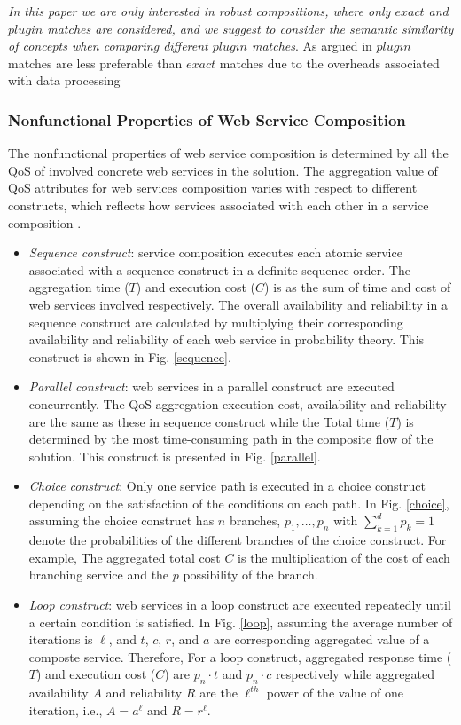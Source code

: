 \emph{In this paper we are only interested in robust compositions, where only $exact$ and $plugin$ matches are considered, and we suggest to consider the semantic similarity of concepts when comparing different $plugin$ matches}. As argued in \cite{lecue2009optimizing} $plugin$ matches are less preferable than $exact$ matches due to the overheads associated with data processing


\subsubsection{Nonfunctional Properties of Web Service Composition}
The nonfunctional properties of web service composition is determined by all the QoS of involved concrete web services in the solution. The aggregation value of QoS attributes for web services composition varies with respect to different constructs, which reflects how services associated with each other in a service composition \cite{zeng2003quality}.
\begin{itemize}

\item \emph{Sequence construct}: service composition executes each atomic service associated with a sequence construct in a definite sequence order. The aggregation time ($T$) and execution cost ($C$) is as the sum of time and cost of web services involved respectively. The overall availability and reliability in a sequence construct are calculated by multiplying their corresponding availability and reliability of each web service in probability theory. This construct is shown in Fig. \ref{sequence}.
\item \emph{Parallel construct}: web services in a parallel construct are executed concurrently. The QoS aggregation execution cost, availability and reliability are the same as these in sequence construct while the Total time ($T$) is determined by the most time-consuming path in the composite flow of the solution. This construct is presented in Fig. \ref{parallel}.
\item \emph{Choice construct}: Only one service path is executed in a choice construct depending on the satisfaction of the conditions on each path. In Fig. \ref{choice}, assuming the choice construct has $n$ branches, $p_1,\ldots, p_n$ with  $\sum\limits^d_{k=1}p_k=1$ denote the probabilities of the different branches of the choice construct. For example, The aggregated total cost $C$  is the multiplication of the cost of each branching service and the $p$ possibility of the branch.
\item \emph{Loop construct}: web services in a loop construct are executed repeatedly until a certain condition is satisfied. In Fig. \ref{loop}, assuming the average number of iterations is $\ell$, and $t$, $c$, $r$, and $a$ are corresponding aggregated value of a composte service. Therefore, For a loop construct, aggregated response time ($T$) and execution cost ($C$) are $p_n \cdot t$ and $p_n \cdot c$ respectively while aggregated availability $A$ and reliability $R$ are the $\ell^{th}$ power of the value of one iteration, i.e., $A=a^\ell$ and $R=r^\ell$.
\end{itemize}


